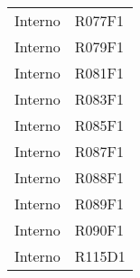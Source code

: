 \documentclass[../analisi-dei-requisiti.tex]{subfiles}
\begin{document}
\begin{longtable}[H]{ p{3cm} | p{4cm} }
  Interno                       & R077F1                               \\
  Interno                       & R079F1                               \\
  Interno                       & R081F1                               \\
  Interno                       & R083F1                               \\
  Interno                       & R085F1                               \\
  Interno                       & R087F1                               \\
  Interno                       & R088F1                               \\
  Interno                       & R089F1                               \\
  Interno                       & R090F1                               \\
  Interno                       & R115D1                               \\
\end{longtable}
\end{document}

